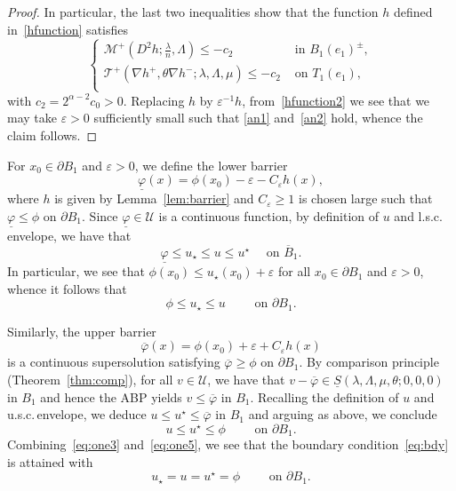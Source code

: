 \documentclass[letter,11pt]{amsart}
\newcommand{\vep}{\varepsilon}
\newcommand{\mcal}{\mathcal{M}}
\newcommand{\tcal}{\mathcal{T}}
\newcommand{\usc}{u.s.c.\,}
\newcommand{\lsc}{l.s.c.\,}
\newcommand{\subsol}{\mathcal{U}}
\theoremstyle{definition}
\numberwithin{equation}{section}
\begin{document}
\begin{proof}
In particular, the last two inequalities show that the function $h$ defined in~\eqref{hfunction} satisfies
\begin{equation}
\label{hfunction2}
\begin{cases}
\mcal^{+}(D^2 h; \frac{\lambda}{n}, \Lambda) \leq - c_2 & \text{ in } B_1(e_1)^{\pm},\\
\tcal^{+}(\nabla h^{+}, \theta \nabla h^{-}; \lambda, \Lambda, \mu) \leq - c_2 & \text{ on } T_1(e_1),\\
\end{cases}
\end{equation}
with $c_2 = 2^{\alpha-2} c_0 > 0$.
Replacing $h$ by $\vep^{-1} h$, from~\eqref{hfunction2} we see that we may take $\vep > 0$ sufficiently small such that \eqref{an1} and~\eqref{an2} hold, whence the claim follows.
\end{proof}

\medskip

For $x_0 \in \partial B_1$ and $\vep >0$, we define the lower barrier
\[
\underline{\varphi}(x) = \phi(x_0) - \vep - C_{\vep} h(x),
\]
where $h$ is given by Lemma~\ref{lem:barrier} and $C_{\vep} \geq 1$ is chosen large such that $\underline{\varphi} \leq \phi$ on $\partial B_1$.
Since $\underline{\varphi} \in \subsol$ is a continuous function, by definition of $u$  and \lsc envelope, we have that
\[
\underline{\varphi} \leq u_{\star} \leq u \leq u^{\star} \quad \text{ on } \overline{B}_1.
\]
In particular, we see that $\phi(x_0) \leq u_{\star}(x_0) + \vep$ for all $x_0 \in \partial B_1$ and $\vep > 0$, whence it follows that
\begin{equation}
\label{eq:one3}
\phi \leq u_{\star} \leq u
\qquad \text{ on } \partial B_1.
\end{equation}

\medskip

Similarly, the upper barrier
\[
\overline{\varphi}(x) = \phi(x_0) + \vep + C_{\vep} h(x)
\]
is a continuous supersolution satisfying $\overline{\varphi} \geq \phi$ on $\partial B_1$.
By comparison principle (Theorem~\ref{thm:comp}), for all $v \in \subsol$, we have that $v - \overline{\varphi} \in \underline{S}(\lambda, \Lambda, \mu, \theta; 0,0,0)$ in $B_1$ and hence the ABP yields $v \leq \overline{\varphi}$ in $B_1$.
Recalling the definition of $u$ and \usc envelope, we deduce $u \leq u^{\star} \leq \overline{\varphi}$ in $B_1$ and arguing as above, we conclude
\begin{equation}
\label{eq:one5}
u \leq u^{\star} \leq \phi \qquad \text{ on } \partial B_1.
\end{equation}
Combining~\eqref{eq:one3} and~\eqref{eq:one5}, we see that the boundary condition~\eqref{eq:bdy} is attained with
\begin{equation}
\label{bdy:thing}
u_{\star} = u = u^{\star} = \phi \qquad \text{ on } \partial B_1.
\end{equation}
\end{document}
